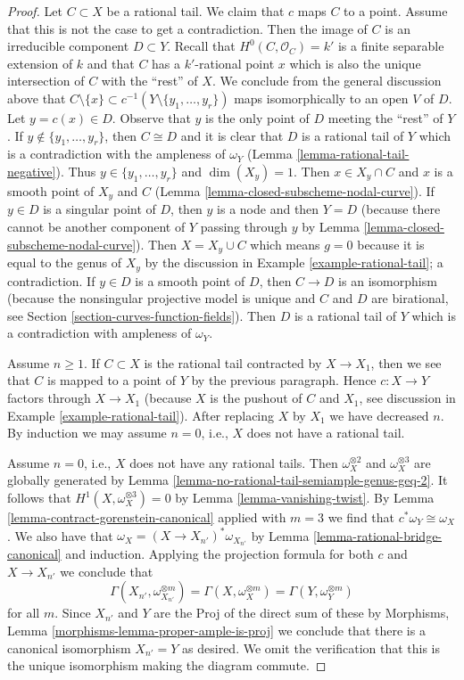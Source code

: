 \documentclass[10pt,a4paper]{amsart}
\theoremstyle{plain}
\theoremstyle{definition}
\theoremstyle{remark}
\numberwithin{equation}{subsection}
\begin{document}
\begin{proof}
\medskip\noindent
Let $C \subset X$ be a rational tail.
We claim that $c$ maps $C$ to a point. Assume that this
is not the case to get a contradiction. Then the image
of $C$ is an irreducible component $D \subset Y$.
Recall that $H^0(C, \mathcal{O}_C) = k'$ is a finite separable
extension of $k$ and that $C$ has a $k'$-rational point $x$
which is also the unique intersection of $C$ with the ``rest'' of $X$.
We conclude from the general discussion above that
$C \setminus \{x\} \subset c^{-1}(Y \setminus \{y_1, \ldots, y_r\})$
maps isomorphically to an open $V$ of $D$. Let $y = c(x) \in D$.
Observe that $y$ is the only point of $D$ meeting the
``rest'' of $Y$. If $y \not \in \{y_1, \ldots, y_r\}$, then $C \cong D$
and it is clear that $D$ is a rational tail of $Y$ which is
a contradiction with the ampleness of $\omega_Y$
(Lemma \ref{lemma-rational-tail-negative}).
Thus $y \in \{y_1, \ldots, y_r\}$ and $\dim(X_y) = 1$.
Then $x \in X_y \cap C$ and $x$ is a smooth point of $X_y$ and $C$
(Lemma \ref{lemma-closed-subscheme-nodal-curve}).
If $y \in D$ is a singular point of $D$, then $y$ is a node
and then $Y = D$ (because there cannot be another component of
$Y$ passing through $y$ by Lemma \ref{lemma-closed-subscheme-nodal-curve}).
Then $X = X_y \cup C$ which means $g = 0$ because it is
equal to the genus of $X_y$ by the discussion in
Example \ref{example-rational-tail}; a contradiction.
If $y \in D$ is a smooth point of $D$, then
$C \to D$ is an isomorphism (because the nonsingular projective
model is unique and $C$ and $D$ are birational, see
Section \ref{section-curves-function-fields}). Then $D$ is
a rational tail of $Y$ which is a contradiction with
ampleness of $\omega_Y$.

\medskip\noindent
Assume $n \geq 1$. If $C \subset X$ is the rational tail contracted
by $X \to X_1$, then we see that $C$ is mapped to a point of $Y$ by
the previous paragraph. Hence $c : X \to Y$ factors through $X \to X_1$
(because $X$ is the pushout of $C$ and $X_1$, see discussion in
Example \ref{example-rational-tail}).
After replacing $X$ by $X_1$ we have decreased
$n$. By induction we may assume $n = 0$, i.e., $X$ does not have
a rational tail.

\medskip\noindent
Assume $n = 0$, i.e., $X$ does not have any rational tails.
Then $\omega_X^{\otimes 2}$ and $\omega_X^{\otimes 3}$ are
globally generated by Lemma \ref{lemma-no-rational-tail-semiample-genus-geq-2}.
It follows that $H^1(X, \omega_X^{\otimes 3}) = 0$ by
Lemma \ref{lemma-vanishing-twist}.
By Lemma \ref{lemma-contract-gorenstein-canonical} applied with $m = 3$
we find that $c^*\omega_Y \cong \omega_X$.
We also have that $\omega_X = (X \to X_{n'})^*\omega_{X_{n'}}$ by
Lemma \ref{lemma-rational-bridge-canonical} and induction.
Applying the projection formula for both $c$ and
$X \to X_{n'}$ we conclude that
$$
\Gamma(X_{n'}, \omega_{X_{n'}}^{\otimes m}) =
\Gamma(X, \omega_X^{\otimes m}) =
\Gamma(Y, \omega_Y^{\otimes m})
$$
for all $m$.
Since $X_{n'}$ and $Y$ are the Proj of the direct sum of these
by Morphisms, Lemma \ref{morphisms-lemma-proper-ample-is-proj}
we conclude that there is a canonical isomorphism $X_{n'} = Y$
as desired. We omit the verification that this is the unique
isomorphism making the diagram commute.
\end{proof}
\end{document}
